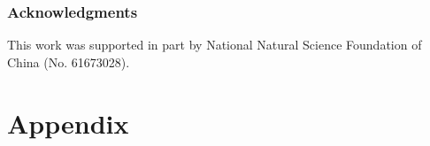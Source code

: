 \documentclass{article} %
\begin{document}


\subsubsection*{Acknowledgments}
This work was supported in part by National Natural Science Foundation of China (No. 61673028).





\newpage
\appendix
\section{Appendix}
\end{document}
